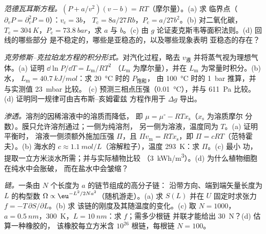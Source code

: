 \begin{exercise}[$\star\star$]\label{exo:b2:thermodynamic-potentials:9}
\emph{范德瓦耳斯方程。}$(P + a/v^2)(v - b) = RT$（摩尔量）。(a) 求
临界点（$\partial_vP = \partial_v^2P = 0$）：$v_{\text{c}} = 3b$，
$T_{\text{c}} = 8a/27Rb$，$P_{\text{c}} = a/27b^2$。(b) 对二氧化碳，
$T_{\text{c}} = \qty{304}{K}$，$P_{\text{c}} = \qty{73.8}{bar}$，求 $a$ 与 $b$。(c)
由 $g$ 论证麦克斯韦等面积法则。(d) 回线的哪些部分
是不稳定的，哪些是亚稳态的，以及哪些现象表明
亚稳态的存在？
\end{exercise}

\begin{exercise}[$\star\star\star$]\label{exo:b2:thermodynamic-potentials:10}
\emph{克劳修斯–克拉珀龙方程的积分形式。}对汽化过程，略去 $v_{\text{液}}$
并将蒸气视为理想气体。(a) 证明 $\dd\ln P/\dd T = L_{\text{m}}/RT^2$
（$L_{\text{m}}$ 为摩尔量），并在 $L_{\text{m}}$ 为常量时积分。(b) 水，
$L_{\text{m}} = \qty{40.7}{kJ/mol}$：求 \qty{20}{\celsius} 时的 $P_{\text{饱和}}$，
由 \qty{100}{\celsius} 时的 \qty{1}{bar} 推算，并与实测值 \qty{23}{mbar} 比较。
(c) 预测三相点压强（\qty{0.01}{\celsius}），并与
\qty{611}{Pa} 比较。(d) 证明同一规律可由吉布斯–亥姆霍兹
方程作用于 $\Delta g$ 导出。
\end{exercise}

\begin{exercise}[$\star\star\star$]\label{exo:b2:thermodynamic-potentials:11}
\emph{渗透。}溶剂的因稀溶液中的溶质而降低，
即 $\mu = \mu^\circ - RTx_{\text{s}}$（$x_{\text{s}}$ 为溶质摩尔
分数）。膜只允许溶剂通过；一侧为纯溶剂，
另一侧为溶液，温度同为 $T$。(a) 证明平衡时，
溶液一侧须额外施加压强 $\Pi$，且 $\Pi v_{\text{m}} =
RTx_{\text{s}}$，即 $\Pi = cRT$（范特霍夫）。(b) 海水的 $c \approx
\qty{1.1}{mol/L}$（溶解粒子），温度 \qty{293}{K}：求 $\Pi$。(c) 最小
功，提取一立方米淡水所需；并与实际植物比较
（\qty{3}{kWh/m^3}）。(d) 为什么植物细胞在纯水中会胀破，
而在盐水中会皱缩？
\end{exercise}

\begin{exercise}[$\star\star\star$]\label{exo:b2:thermodynamic-potentials:12}
\emph{链。}一条由 $N$ 个长度为 $a$ 的链节组成的高分子链：
沿带方向、端到端矢量长度为 $L$ 的构型数
$\Omega \propto \eu^{-L^2/2Na^2}$（随机游走）。(a) 求 $S(L)$
并在 $U$ 固定时求张力 $f = -T\,\partial S/\partial L$。(b) 求
该链的刚度及其随温度的变化。(c) 取 $N = 1000$，$a =
\qty{0.5}{nm}$，\qty{300}{K}，$L = \qty{10}{nm}$：求 $f$；需多少根链
并联才能给出 \qty{30}{N}？(d) 估算一种橡胶的，
该橡胶每立方米含 $10^{26}$ 根链，每根链 $N = 100$。
\end{exercise}

